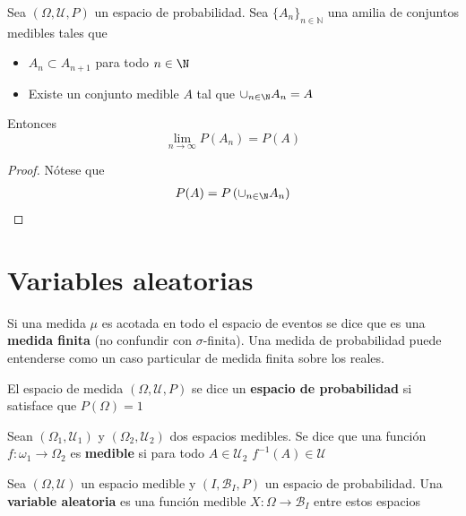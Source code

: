 \begin{proposicion}
Sea $(\Omega,\mathcal{U},P)$ un espacio de probabilidad. Sea $\{ A_n \}_{n\in \mathbb{N}}$ una amilia de conjuntos medibles tales que 
\begin{itemize}
\item $A_n \subset A_{n+1}$ para todo $n \in \N$
\item Existe un conjunto medible $A$ tal que $\cup_{n\in \N} A_n = A$
\end{itemize}
Entonces
\begin{equation}
\lim_{n\rightarrow \infty} P(A_n) = P(A)
\end{equation}
\end{proposicion}
\begin{proof}
Nótese que
\begin{align*}
P(A) &= P\left( \cup_{n\in \N} A_n \right) \\
\end{align*}
\end{proof}


\section{Variables aleatorias}

Si una medida $\mu$ es acotada en todo el espacio de eventos se dice que es una \textbf{medida finita} (no confundir con $\sigma$-finita). 
%
Una medida de probabilidad puede entenderse como un caso particular de medida finita sobre los reales.

\begin{definicion}
El espacio de medida $(\Omega,\mathcal{U},P)$ se dice un \textbf{espacio de probabilidad} si satisface que $P(\Omega) = 1$ 
\end{definicion}

\begin{definicion}
Sean $(\Omega_1,\mathcal{U}_1)$ y $(\Omega_2,\mathcal{U}_2)$ dos espacios medibles. Se dice que una función $f: \omega_1 \rightarrow \Omega_2$ es \textbf{medible} si para todo $A\in \mathcal{U}_2$
$f^{-1}(A)\in\mathcal{U}$
\end{definicion}

\begin{definicion}
Sea $(\Omega,\mathcal{U})$ un espacio medible y $(I,\mathcal{B}_I,P)$ un espacio de probabilidad. Una \textbf{variable aleatoria} es una función medible $X: \Omega \rightarrow \mathcal{B}_I$ entre estos espacios
\end{definicion}

